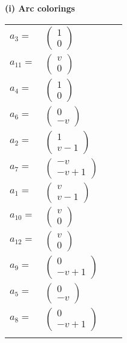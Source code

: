 \documentclass[1p]{elsarticle_modified}
\theoremstyle{definition}
\begin{document}
\flushleft \textbf{(i) Arc colorings}\\
\begin{tabular}{m{7pt} m{180pt} m{7pt} m{180pt} }
\flushright $a_{3}=$&$\begin{pmatrix}1\\0\end{pmatrix}$ \\
\flushright $a_{11}=$&$\begin{pmatrix}v\\0\end{pmatrix}$ \\
\flushright $a_{4}=$&$\begin{pmatrix}1\\0\end{pmatrix}$ \\
\flushright $a_{6}=$&$\begin{pmatrix}0\\- v\end{pmatrix}$ \\
\flushright $a_{2}=$&$\begin{pmatrix}1\\v-1\end{pmatrix}$ \\
\flushright $a_{7}=$&$\begin{pmatrix}- v\\- v+1\end{pmatrix}$ \\
\flushright $a_{1}=$&$\begin{pmatrix}v\\v-1\end{pmatrix}$ \\
\flushright $a_{10}=$&$\begin{pmatrix}v\\0\end{pmatrix}$ \\
\flushright $a_{12}=$&$\begin{pmatrix}v\\0\end{pmatrix}$ \\
\flushright $a_{9}=$&$\begin{pmatrix}0\\- v+1\end{pmatrix}$ \\
\flushright $a_{5}=$&$\begin{pmatrix}0\\- v\end{pmatrix}$ \\
\flushright $a_{8}=$&$\begin{pmatrix}0\\- v+1\end{pmatrix}$\\&\end{tabular}
\end{document}
